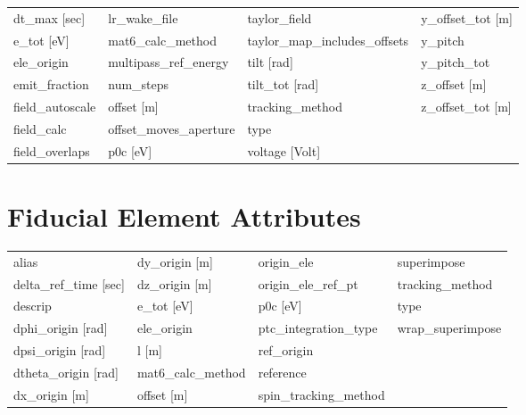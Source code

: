 \begin{tabular}{llll}
dt_max [sec]                     & lr_wake_file                     & taylor_field                     & y_offset_tot [m]                 \\
e_tot [eV]                       & mat6_calc_method                 & taylor_map_includes_offsets      & y_pitch                          \\
ele_origin                       & multipass_ref_energy             & tilt [rad]                       & y_pitch_tot                      \\
emit_fraction                    & num_steps                        & tilt_tot [rad]                   & z_offset [m]                     \\
field_autoscale                  & offset [m]                       & tracking_method                  & z_offset_tot [m]                 \\
field_calc                       & offset_moves_aperture            & type                             &                                  \\
field_overlaps                   & p0c [eV]                         & voltage [Volt]                   &                                  \\
 \bottomrule
 \end{tabular}
 \vfill
 
 \section{Fiducial Element Attributes}
 \label{s:list.fiducial}
 
 \begin{tabular}{llll} \toprule
alias                            & dy_origin [m]                    & origin_ele                       & superimpose                      \\
delta_ref_time [sec]             & dz_origin [m]                    & origin_ele_ref_pt                & tracking_method                  \\
descrip                          & e_tot [eV]                       & p0c [eV]                         & type                             \\
dphi_origin [rad]                & ele_origin                       & ptc_integration_type             & wrap_superimpose                 \\
dpsi_origin [rad]                & l [m]                            & ref_origin                       &                                  \\
dtheta_origin [rad]              & mat6_calc_method                 & reference                        &                                  \\
dx_origin [m]                    & offset [m]                       & spin_tracking_method             &                                  \\
 \bottomrule
 \end{tabular}
 \vfill
 
